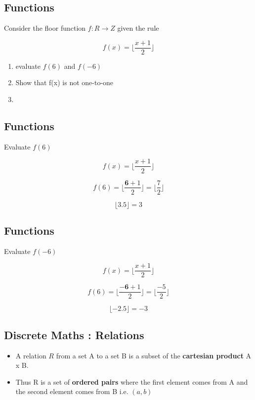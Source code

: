 \documentclass[]{report}
\begin{document}
\begin{enumerate}
\subsection{Functions}
Consider the floor function $f : R \rightarrow Z$ given the rule

\[ f(x) = \lfloor \frac{x+1}{2} \rfloor \]

\begin{enumerate}
\item evaluate $f(6)$ and $f(-6)$
\item Show that f(x) is not one-to-one
\item 
\end{enumerate}


\subsection{Functions}
Evaluate $f(6)$ 


\[ f(x) = \lfloor \frac{x+1}{2} \rfloor \]


\[ f(6) = \lfloor \frac{\boldsymbol{6}+1}{2}\rfloor = \lfloor  \frac{7}{2}\rfloor\]


\[  \lfloor 3.5 \rfloor  = 3  \]



\subsection{Functions}
Evaluate $f(-6)$ 


\[ f(x) = \lfloor \frac{x+1}{2} \rfloor \]


\[ f(6) = \lfloor \frac{\boldsymbol{-6}+1}{2}\rfloor = \lfloor  \frac{-5}{2}\rfloor\]


\[  \lfloor -2.5 \rfloor  = -3  \]








\subsection{Discrete Maths : Relations}

\begin{itemize}
\item A relation $R$ from a set A to a set B is a subset of the
\textbf{cartesian product} A x B. 
\item Thus R is a set of \textbf{ordered pairs} where
the first element comes from A and the second element comes
from B i.e. $(a, b)$
\end{itemize}


\end{enumerate}
\end{document}

